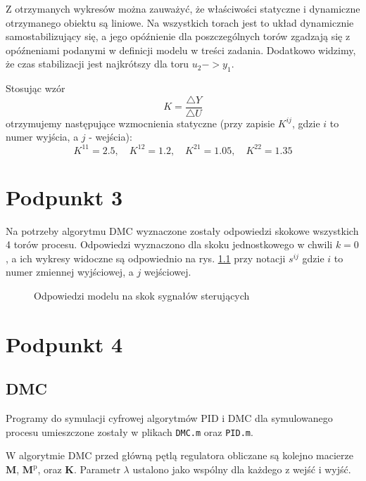 Z otrzymanych wykresów można zauważyć, że właściwości statyczne i dynamiczne otrzymanego obiektu są liniowe. Na wszystkich torach jest to układ dynamicznie samostabilizujący się, a jego opóźnienie dla poszczególnych torów zgadzają się z opóźneniami podanymi w definicji modelu w treści zadania. Dodatkowo widzimy, że czas stabilizacji jest najkrótszy dla toru $u_2 -> y_1$.

Stosując wzór
\begin{equation}
K = \frac{ \triangle Y }{ \triangle U}
\end{equation}
otrzymujemy następujące wzmocnienia statyczne (przy zapisie $ K^{ij} $, gdzie $ i $ to numer wyjścia, a $ j $ - wejścia):
\begin{equation}
  K^{11} = \num{2,5}, \quad K^{12} = \num{1,2}, \quad K^{21} = \num{1,05}, \quad K^{22} = \num{1,35}  
 \end{equation}


\chapter{Podpunkt 3}
Na potrzeby algorytmu DMC wyznaczone zostały odpowiedzi skokowe wszystkich 4 torów procesu. Odpowiedzi wyznaczono dla skoku jednostkowego w chwili $ k=0 $, a ich wykresy widoczne są odpowiednio na rys. \ref{Z3} przy notacji $ s^{ij} $ gdzie $ i $ to numer zmiennej wyjściowej, a $ j $ wejściowej.

\begin{figure}[ht]
\centering

\caption{Odpowiedzi modelu na skok sygnałów sterujących}
\label{Z3}
\end{figure}


\chapter{Podpunkt 4}
\section{DMC}
Programy do symulacji cyfrowej algorytmów PID i DMC dla symulowanego procesu umieszczone zostały w plikach \verb+DMC.m+ oraz \verb+PID.m+.

W algorytmie DMC przed główną pętlą regulatora obliczane są kolejno macierze $ \boldsymbol{M} $, $ \boldsymbol{M}^\mathrm{p}$, oraz $ \boldsymbol{K} $. Parametr $ \lambda $ ustalono jako wspólny dla każdego z wejść i wyjść.


